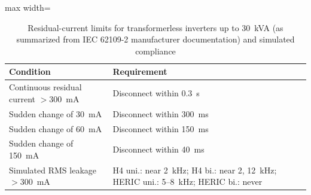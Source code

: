 \begin{table}[!t]
\renewcommand{\arraystretch}{1.2}
\caption{Residual-current limits for transformerless inverters up to 30~kVA (as summarized from IEC 62109-2 manufacturer documentation) and simulated compliance}
\label{tab:limits}
\centering
\footnotesize
\begin{adjustbox}{max width=\columnwidth}
\begin{tabular}{p{3.6cm}p{4.3cm}}
\toprule
Condition & Requirement \\
\midrule
Continuous residual current $>300$~mA & Disconnect within 0.3~s \\
Sudden change of 30~mA & Disconnect within 300~ms \\
Sudden change of 60~mA & Disconnect within 150~ms \\
Sudden change of 150~mA & Disconnect within 40~ms \\
\midrule
Simulated RMS leakage $>300$~mA & H4 uni.: near 2~kHz; H4 bi.: near 2, 12~kHz; HERIC uni.: 5--8~kHz; HERIC bi.: never \\
\bottomrule
\end{tabular}
\end{adjustbox}
\end{table}
